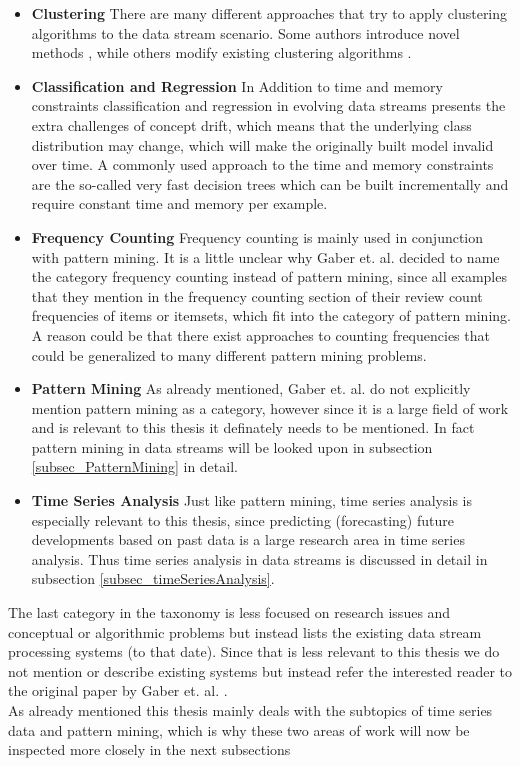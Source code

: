 \begin{itemize}
	\item \textbf{Clustering} There are many different approaches that try to apply clustering algorithms to the data stream scenario. Some authors introduce novel methods \cite{aggarwal2003framework} \cite{aggarwal2004framework}, while others modify existing clustering algorithms \cite{guha2000clustering}.
	\item \textbf{Classification and Regression} In Addition to time and memory constraints classification and regression in evolving data streams presents the extra challenges of concept drift, which means that the underlying class distribution may change, which will make the originally built model invalid over time. A commonly used approach to the time and memory constraints are the so-called very fast decision trees \cite{domingos2000mining} which can be built incrementally and require constant time and memory per example.
	\item \textbf{Frequency Counting} Frequency counting is mainly used in conjunction with pattern mining. It is a little unclear why Gaber et. al. decided to name the category frequency counting instead of pattern mining, since all examples that they mention in the frequency counting section of their review count frequencies of items or itemsets, which fit into the category of pattern mining. A reason could be that there exist approaches to counting frequencies that could be generalized to many different pattern mining problems.
	\item \textbf{Pattern Mining} As already mentioned, Gaber et. al. do not explicitly mention pattern mining as a category, however since it is a large field of work and is relevant to this thesis it definately needs to be mentioned. In fact pattern mining in data streams will be looked upon in subsection \ref{subsec_PatternMining} in detail. 
	\item \textbf{Time Series Analysis} Just like pattern mining, time series analysis is especially relevant to this thesis, since predicting (forecasting) future developments based on past data is a large research area in time series analysis. Thus time series analysis in data streams is discussed in detail in subsection \ref{subsec_timeSeriesAnalysis}.
\end{itemize}

The last category in the taxonomy is less focused on research issues and conceptual or algorithmic problems but instead lists the existing data stream processing systems (to that date). Since that is less relevant to this thesis we do not mention or describe existing systems but instead refer the interested reader to the original paper by Gaber et. al. \cite{gaber2005mining}. \\
As already mentioned this thesis mainly deals with the subtopics of time series data and pattern mining, which is why these two areas of work will now be inspected more closely in the next subsections

